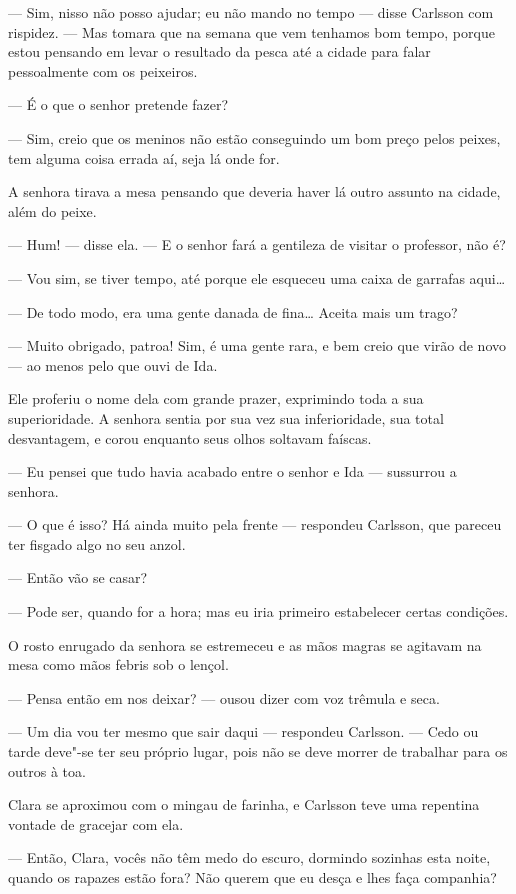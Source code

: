 --- Sim, nisso não posso ajudar; eu não mando no tempo --- disse Carlsson com
rispidez. --- Mas tomara que na semana que vem tenhamos bom tempo, porque estou
pensando em levar o resultado da pesca até a cidade para falar pessoalmente com
os peixeiros.

--- É o que o senhor pretende fazer?

--- Sim, creio que os meninos não estão conseguindo um bom preço pelos peixes, tem
alguma coisa errada aí, seja lá onde for.

A senhora tirava a mesa pensando que deveria haver lá outro assunto na cidade,
além do peixe.

--- Hum! --- disse ela. --- E o senhor fará a gentileza de visitar o professor,
não é?

--- Vou sim, se tiver tempo, até porque ele esqueceu uma caixa de garrafas
aqui\ldots{}

--- De todo modo, era uma gente danada de fina\ldots{} Aceita mais um trago?

--- Muito obrigado, patroa! Sim, é uma gente rara, e bem creio que virão de novo ---
ao menos pelo que ouvi de Ida.

Ele proferiu o nome dela com grande prazer, exprimindo toda a sua superioridade. A
senhora sentia por sua vez sua inferioridade, sua total desvantagem, e corou
enquanto seus olhos soltavam faíscas.

--- Eu pensei que tudo havia acabado entre o senhor e Ida --- sussurrou a senhora.

--- O que é isso? Há ainda muito pela frente --- respondeu Carlsson, que pareceu
ter fisgado algo no seu anzol.

--- Então vão se casar?

--- Pode ser, quando for a hora; mas eu iria primeiro estabelecer certas
condições.

O rosto enrugado da senhora se estremeceu e as mãos magras se agitavam na mesa
como mãos febris sob o lençol.

--- Pensa então em nos deixar? --- ousou dizer com voz trêmula e seca.

--- Um dia vou ter mesmo que sair daqui --- respondeu Carlsson. --- Cedo ou tarde
deve"-se ter seu próprio lugar, pois não se deve morrer de trabalhar para os
outros à toa.

Clara se aproximou com o mingau de farinha, e Carlsson teve uma repentina
vontade de gracejar com ela.

--- Então, Clara, vocês não têm medo do escuro, dormindo sozinhas esta noite, quando
os rapazes estão fora? Não querem que eu desça e lhes faça companhia?

